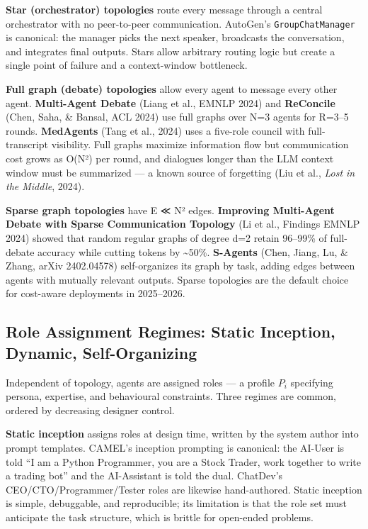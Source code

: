 \textbf{Star (orchestrator) topologies} route every message through a central orchestrator with no peer-to-peer communication. AutoGen's \texttt{GroupChatManager} is canonical: the manager picks the next speaker, broadcasts the conversation, and integrates final outputs. Stars allow arbitrary routing logic but create a single point of failure and a context-window bottleneck.

\textbf{Full graph (debate) topologies} allow every agent to message every other agent. \textbf{Multi-Agent Debate} (Liang et al., EMNLP 2024) and \textbf{ReConcile} (Chen, Saha, \& Bansal, ACL 2024) use full graphs over N=3 agents for R=3--5 rounds. \textbf{MedAgents} (Tang et al., 2024) uses a five-role council with full-transcript visibility. Full graphs maximize information flow but communication cost grows as O(N²) per round, and dialogues longer than the LLM context window must be summarized --- a known source of forgetting (Liu et al., \emph{Lost in the Middle}, 2024).

\textbf{Sparse graph topologies} have \textbar E\textbar{} ≪ N² edges. \textbf{Improving Multi-Agent Debate with Sparse Communication Topology} (Li et al., Findings EMNLP 2024) showed that random regular graphs of degree d=2 retain 96--99\% of full-debate accuracy while cutting tokens by \textasciitilde50\%. \textbf{S-Agents} (Chen, Jiang, Lu, \& Zhang, arXiv 2402.04578) self-organizes its graph by task, adding edges between agents with mutually relevant outputs. Sparse topologies are the default choice for cost-aware deployments in 2025--2026.

\subsection{Role Assignment Regimes: Static Inception, Dynamic, Self-Organizing}\label{role-assignment-regimes-static-inception-dynamic-self-organizing}

Independent of topology, agents are assigned roles --- a profile \(P_i\) specifying persona, expertise, and behavioural constraints. Three regimes are common, ordered by decreasing designer control.

\textbf{Static inception} assigns roles at design time, written by the system author into prompt templates. CAMEL's inception prompting is canonical: the AI-User is told ``I am a Python Programmer, you are a Stock Trader, work together to write a trading bot'' and the AI-Assistant is told the dual. ChatDev's CEO/CTO/Programmer/Tester roles are likewise hand-authored. Static inception is simple, debuggable, and reproducible; its limitation is that the role set must anticipate the task structure, which is brittle for open-ended problems.

